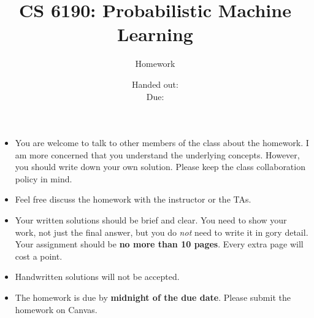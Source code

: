 \documentclass[12pt, fullpage,letterpaper]{article}
\title{CS 6190: Probabilistic Machine Learning \semester}
\author{Homework \assignmentId}
\date{Handed out: \releaseDate\\
  Due: \dueDate}
\begin{document}
\maketitle


\footnotesize
	\begin{itemize}
		\item You are welcome to talk to other members of the class about
		the homework. I am more concerned that you understand the
		underlying concepts. However, you should write down your own
		solution. Please keep the class collaboration policy in mind.
		
		\item Feel free discuss the homework with the instructor or the TAs.
		
		\item Your written solutions should be brief and clear. You need to
		show your work, not just the final answer, but you do \emph{not}
		need to write it in gory detail. Your assignment should be {\bf no
			more than 10 pages}. Every extra page will cost a point.
		
		\item Handwritten solutions will not be accepted.
		
		\item The homework is due by \textbf{midnight of the due date}. Please submit
		the homework on Canvas.
	\end{itemize}
\end{document}
